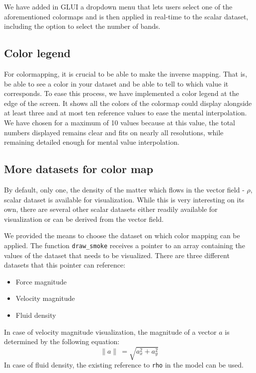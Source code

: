 		We have added in GLUI a dropdown menu that lets users select one of the aforementioned colormaps and is then applied in real-time to the scalar dataset, including the option to select the number of bands.
	\subsection{Color legend}
		For colormapping, it is crucial to be able to make the inverse mapping. 
		That is, be able to see a color in your dataset and be able to tell to which value it corresponds. 
		To ease this process, we have implemented a color legend at the edge of the screen. 
		It shows all the colors of the colormap could display alongside at least three and at most ten reference values to ease the mental interpolation. 
		We have chosen for a maximum of 10 values because at this value, the total numbers displayed remains clear and fits on nearly all resolutions, while remaining detailed enough for mental value interpolation.
	\subsection*{More datasets for color map}
		By default, only one, the density of the matter which flows in the vector field - \(\rho\), scalar dataset is available for visualization. 
		While this is very interesting on its own, there are several other scalar datasets either readily available for visualization or can be derived from the vector field.

		We provided the means to choose the dataset on which color mapping can be applied.
		The function \texttt{draw\_smoke} receives a pointer to an array containing the values of the dataset that needs to be visualized.
		There are three different datasets that this pointer can reference:
		\begin{itemize}
			\item Force magnitude
			\item Velocity magnitude
			\item Fluid density
		\end{itemize}
		In case of velocity magnitude visualization, the magnitude of a vector \(a\) is determined by the following equation:
		\[\| a \|\ = \sqrt{a_x^2 + a_y^2}\]
		In case of fluid density, the existing reference to \texttt{rho} in the model can be used.
